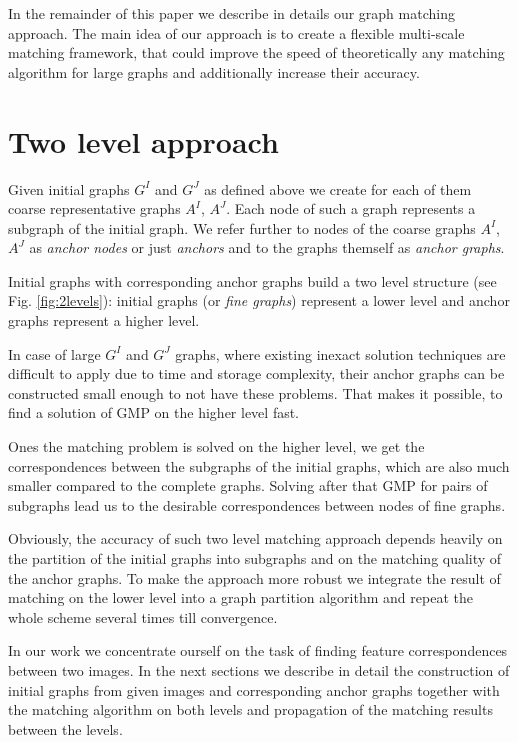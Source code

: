 In the remainder of this paper we describe in details our graph matching approach.
The main idea of our approach is to create a flexible multi-scale matching framework, that could improve the speed of
theoretically any matching algorithm for large graphs and additionally increase their accuracy. 

\section{Two level approach}
Given initial graphs $G^I$ and $G^J$ as defined above we create for each of them coarse representative graphs $A^I$, $A^J$. Each node of such a graph represents a subgraph of the initial graph. We refer further to nodes of the coarse graphs $A^I$, $A^J$ as \emph{anchor nodes} or just \emph{anchors} and to the graphs themself as \emph{anchor graphs}.

Initial graphs with corresponding anchor graphs build a two level structure (see Fig. \ref{fig:2levels}): initial graphs (or \emph{fine graphs}) represent a lower level and anchor graphs represent a higher level.  

In case of large $G^I$ and $G^J$ graphs, where existing inexact solution techniques are difficult to apply due to time and storage complexity, their anchor graphs can be constructed small enough to not have these problems. That makes it possible, to find a solution of GMP on the higher level fast. 

Ones the matching problem is solved on the higher level, we get the correspondences between the subgraphs of the initial graphs, which are also much smaller compared to the complete graphs. Solving after that GMP for pairs of subgraphs lead us to the desirable correspondences between nodes of fine graphs.

Obviously, the accuracy of such two level matching approach depends heavily on the partition of the initial graphs into subgraphs and on the matching quality of the anchor graphs. To make the approach more robust we integrate the result of matching on the lower level into a graph partition algorithm and repeat the whole scheme several times till convergence.

In our work we concentrate ourself on the task of finding feature correspondences between two images. In the next sections we describe in detail the construction of initial graphs from given images and corresponding anchor graphs together with the matching algorithm on both levels and propagation of the matching results between the levels.

